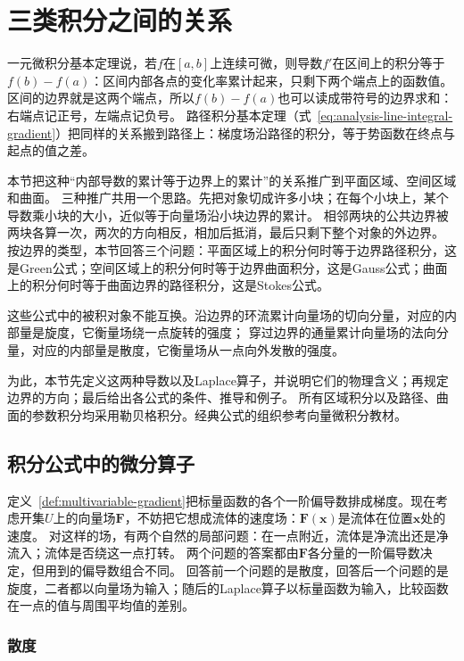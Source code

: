 \section{三类积分之间的关系}
\label{sec:multivariable-boundary-relations}

一元微积分基本定理说，若$f$在$[a,b]$上连续可微，则导数$f'$在区间上的积分等于$f(b)-f(a)$：区间内部各点的变化率累计起来，只剩下两个端点上的函数值。
区间的边界就是这两个端点，所以$f(b)-f(a)$也可以读成带符号的边界求和：右端点记正号，左端点记负号。
路径积分基本定理（式~\eqref{eq:analysis-line-integral-gradient}）把同样的关系搬到路径上：梯度场沿路径的积分，等于势函数在终点与起点的值之差。

本节把这种“内部导数的累计等于边界上的累计”的关系推广到平面区域、空间区域和曲面。
三种推广共用一个思路。先把对象切成许多小块；在每个小块上，某个导数乘小块的大小，近似等于向量场沿小块边界的累计。
相邻两块的公共边界被两块各算一次，两次的方向相反，相加后抵消，最后只剩下整个对象的外边界。
按边界的类型，本节回答三个问题：平面区域上的积分何时等于边界路径积分，这是Green公式；空间区域上的积分何时等于边界曲面积分，这是Gauss公式；曲面上的积分何时等于曲面边界的路径积分，这是Stokes公式。

这些公式中的被积对象不能互换。沿边界的环流累计向量场的切向分量，对应的内部量是旋度，它衡量场绕一点旋转的强度；
穿过边界的通量累计向量场的法向分量，对应的内部量是散度，它衡量场从一点向外发散的强度。

为此，本节先定义这两种导数以及Laplace算子，并说明它们的物理含义；再规定边界的方向；最后给出各公式的条件、推导和例子。
所有区域积分以及路径、曲面的参数积分均采用勒贝格积分。经典公式的组织参考向量微积分教材。

\subsection{积分公式中的微分算子}

定义~\ref{def:multivariable-gradient}把标量函数的各个一阶偏导数排成梯度。现在考虑开集$U$上的向量场$\bm F$，不妨把它想成流体的速度场：$\bm F(\bm x)$是流体在位置$\bm x$处的速度。
对这样的场，有两个自然的局部问题：在一点附近，流体是净流出还是净流入；流体是否绕这一点打转。
两个问题的答案都由$\bm F$各分量的一阶偏导数决定，但用到的偏导数组合不同。
回答前一个问题的是散度，回答后一个问题的是旋度，二者都以向量场为输入；随后的Laplace算子以标量函数为输入，比较函数在一点的值与周围平均值的差别。

\subsubsection{散度}

